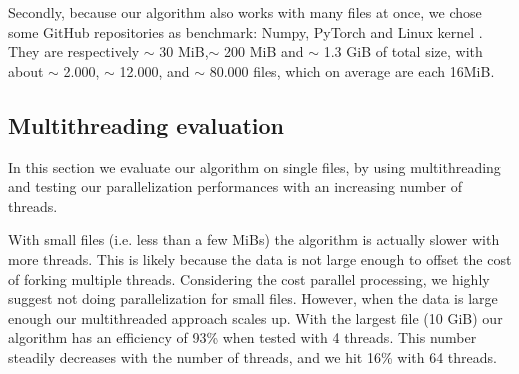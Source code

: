 Secondly, because our algorithm also works with many files at once, we chose some GitHub repositories as benchmark: Numpy\cite{2020NumPy-Array}, PyTorch \cite{Paszke_PyTorch_An_Imperative_2019} and Linux kernel \cite{linux}. They are respectively $\sim$ 30 MiB,$\sim$ 200 MiB and $\sim$ 1.3 GiB of total size, with about $\sim$ 2.000, $\sim$ 12.000, and  $\sim$ 80.000 files, which on average are each 16MiB.



\subsection{Multithreading evaluation}
In this section we evaluate our algorithm on single files, by using multithreading and testing our parallelization performances with an increasing number of threads.

With small files (i.e. less than a few MiBs) the algorithm is actually slower with more threads. This is likely because the data is not large enough to offset the cost of forking multiple threads. Considering the cost parallel processing, we highly suggest not doing parallelization for small files. However, when the data is large enough our multithreaded approach scales up. With the largest file (10 GiB) our algorithm has an efficiency of 93\% when tested with 4 threads. This number steadily decreases with the number of threads, and we hit 16\% with 64 threads.

